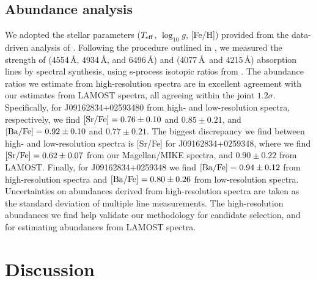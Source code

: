 \documentclass[a4paper,fleqn,usenatbib]{mnras}
\begin{document}
\subsection{Abundance analysis}
We adopted the stellar parameters ($T_{\rm eff}$, $\log_{10}g$, [Fe/H]) provided from the data-driven analysis of \citet{ho2017}. Following the procedure outlined in \citet{casey2014}, we measured the strength of  (4554\,\AA, 4934\,\AA, and 6496\,\AA) and  (4077\,\AA\ and 4215\,\AA) absorption lines by spectral synthesis, using s-process isotopic ratios from \citet{sneden08}. The abundance ratios we estimate from high-resolution spectra are in excellent agreement with our estimates from LAMOST spectra, all agreeing within the joint $1.2\sigma$. Specifically, for J09162834+02593480 from high- and low-resolution spectra, respectively, we find $[{\rm Sr/Fe}] = 0.76 \pm 0.10$ and $0.85 \pm 0.21$, and $[{\rm Ba/Fe}] = 0.92 \pm 0.10$ and $0.77 \pm 0.21$. The biggest discrepancy we find between high- and low-resolution spectra is [Sr/Fe] for J09162834+0259348, where we find $[{\rm Sr/Fe}] = 0.62 \pm 0.07$ from our Magellan/MIKE spectra, and $0.90 \pm 0.22$ from LAMOST. Finally, for J09162834+0259348 we find $[{\rm Ba/Fe}] = 0.94 \pm 0.12$ from high-resolution spectra and $[{\rm Ba/Fe}] = 0.80 \pm 0.26$ from low-resolution spectra. Uncertainties on abundances derived from high-resolution spectra are taken as the standard deviation of multiple line measurements. The high-resolution abundances we find help validate our methodology for candidate selection, and for estimating abundances from LAMOST spectra.




\section{Discussion}  \label{sec:dis}
\end{document}
